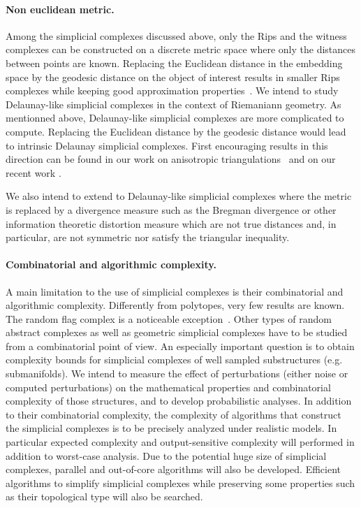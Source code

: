 \paragraph{Non euclidean metric.}
Among the simplicial complexes discussed above, only the Rips and the witness complexes can be constructed on a discrete metric space where only the distances between points are known. 
Replacing the Euclidean distance in the embedding space by the geodesic distance on the object of interest results in smaller Rips complexes while keeping good approximation properties~\cite{dl-clt-2009}. We intend to study Delaunay-like simplicial complexes in the context of Riemaniann geometry. 
As mentionned above, Delaunay-like simplicial complexes are more complicated to compute. Replacing the Euclidean distance by  the geodesic distance would lead to intrinsic Delaunay simplicial complexes. First encouraging results in this direction can be found in our work on anisotropic triangulations~\cite{bwy-luam-08} and on our recent work \cite{boissonnat2012stab}. 


We also intend to extend to Delaunay-like simplicial complexes where the metric is replaced by a divergence measure such as the Bregman divergence or other information theoretic distortion measure which are not true distances and, in particular, are not symmetric nor satisfy the triangular inequality.


\paragraph{Combinatorial and algorithmic complexity.}
A main limitation to the use of simplicial complexes is their combinatorial and algorithmic complexity.  Differently from polytopes, very few results are known. The random flag complex is a noticeable exception~\cite{CambridgeJournals:2077252}. Other types of random abstract complexes as well as geometric simplicial complexes have to be studied from a combinatorial point of view. An especially important question is to obtain complexity bounds for simplicial complexes of well sampled substructures (e.g. submanifolds).  We intend to measure the effect of perturbations (either noise or computed perturbations) on the mathematical properties and combinatorial complexity of those structures, and to develop probabilistic analyses. In addition to their combinatorial complexity, the complexity of algorithms that construct the simplicial complexes is to be precisely analyzed under realistic models. In particular expected complexity and output-sensitive complexity will performed in addition to worst-case analysis. Due to the potential huge size of simplicial complexes, parallel and out-of-core algorithms will also be developed. Efficient algorithms to simplify simplicial complexes while preserving some properties such as their topological type will also be searched.


